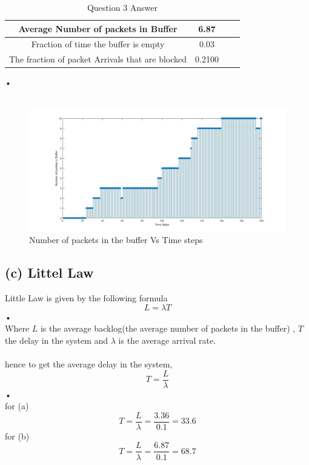 \documentclass[a4paper,11pt]{article}
\begin{document}
\begin{table}
\centering

\begin{tabular}{ |c|c|c|c| } 
\hline
 Average Number of packets in Buffer& 6.87  \\
 \hline
 Fraction of time the buffer is empty& 0.03 \\
 \hline
 The fraction of packet Arrivals that are blocked& 0.2100\\
\hline
\end{tabular}
\caption{Question 3 Answer } \label{tab:q3b}
\end{table}•\\\\
\begin{figure}[h]
   \hspace*{-6cm}
    \includegraphics[scale=0.5]{q3_2}
    \caption{Number of packets in the buffer Vs Time steps}\label{fig:q3b}
\end{figure}
\subsection*{(c) Littel Law}
Little Law is given by the following formula \cite{text}\\
\begin{equation}
L = \lambda T
\end{equation}•\\
Where $L$ is the average backlog(the average number of packets in the buffer) , $T$ the delay in the system and $\lambda$ is the average arrival rate.\\\\
hence to get the average delay in the system,
\begin{equation}
T = \frac{L}{\lambda}
\end{equation}•\\
for (a) \\ $$T = \frac{L}{\lambda}=\frac{3.36}{0.1}=33.6$$
for (b) \\ $$T = \frac{L}{\lambda}=\frac{6.87}{0.1}=68.7$$
\newpage
\end{document}

